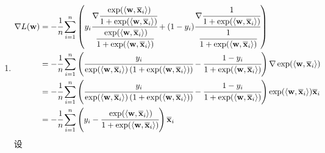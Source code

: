 \documentclass[11pt,letter,notitlepage]{article}
\begin{document}
\begin{solution}
	\begin{enumerate}
		\item $$\begin{aligned}
				      \nabla L(\mathbf{w})
				       & = -\cfrac{1}{n}\sum_{i=1}^{n}{\left( y_i \cfrac{\nabla \cfrac{\exp(\langle \textbf{w},  \overline{\mathbf{x}}_i \rangle)}{1+\exp(\langle \textbf{w},  \overline{\mathbf{x}}_i \rangle) }  }{ \cfrac{\exp(\langle \textbf{w},  \overline{\mathbf{x}}_i \rangle)}{1+\exp(\langle \textbf{w},  \overline{\mathbf{x}}_i \rangle) }  }   +(1-y_i) \cfrac{\nabla \cfrac{1}{1+\exp(\langle \textbf{w},  \overline{\mathbf{x}}_i \rangle) }}{\cfrac{1}{1+\exp(\langle \textbf{w},  \overline{\mathbf{x}}_i \rangle) } } \right)} \\
				       & =-\cfrac{1}{n}\sum_{i=1}^{n}{ \left(
				      \cfrac{y_i}{ \exp(\langle \textbf{w},  \overline{\mathbf{x}}_i \rangle)\left(1+\exp(\langle \textbf{w},  \overline{\mathbf{x}}_i \rangle)\right)}
				      - \cfrac{1-y_i}{1+\exp(\langle \textbf{w},  \overline{\mathbf{x}}_i \rangle)}
				      \right) \nabla \exp(\langle \textbf{w},  \overline{\mathbf{x}}_i \rangle)}                                                                                                                                                                                                                                                                                                                                                                                                                                                  \\
				       & =-\cfrac{1}{n}\sum_{i=1}^{n}{ \left(
				      \cfrac{y_i}{ \exp(\langle \textbf{w},  \overline{\mathbf{x}}_i \rangle)\left(1+\exp(\langle \textbf{w},  \overline{\mathbf{x}}_i \rangle)\right)}
				      - \cfrac{1-y_i}{1+\exp(\langle \textbf{w},  \overline{\mathbf{x}}_i \rangle)}
				      \right) \exp(\langle \textbf{w},  \overline{\mathbf{x}}_i \rangle)} \overline{\mathbf{x}}_i                                                                                                                                                                                                                                                                                                                                                                                                                                 \\
				       & = -\cfrac{1}{n}\sum_{i=1}^{n}{
				      \left(
				      y_i - \cfrac{\exp(\langle \textbf{w},\overline{\mathbf{x}}_i \rangle)}{1+\exp(\langle \textbf{w},\overline{\mathbf{x}}_i \rangle)}
				      \right)
				      \overline{\mathbf{x}}_i
				      }
			      \end{aligned}$$
		      设


\end{enumerate}
\end{solution}
\end{document}
